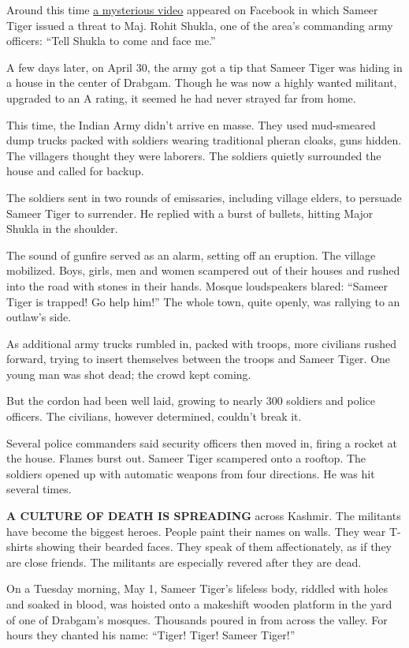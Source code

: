 Around this time \href{https://www.youtube.com/watch?v=Bo8KypsQST4}{a
mysterious video} appeared on Facebook in which Sameer Tiger issued a
threat to Maj. Rohit Shukla, one of the area's commanding army officers:
``Tell Shukla to come and face me.''

A few days later, on April 30, the army got a tip that Sameer Tiger was
hiding in a house in the center of Drabgam. Though he was now a highly
wanted militant, upgraded to an A rating, it seemed he had never strayed
far from home.

This time, the Indian Army didn't arrive en masse. They used mud-smeared
dump trucks packed with soldiers wearing traditional pheran cloaks, guns
hidden. The villagers thought they were laborers. The soldiers quietly
surrounded the house and called for backup.

The soldiers sent in two rounds of emissaries, including village elders,
to persuade Sameer Tiger to surrender. He replied with a burst of
bullets, hitting Major Shukla in the shoulder.

The sound of gunfire served as an alarm, setting off an eruption. The
village mobilized. Boys, girls, men and women scampered out of their
houses and rushed into the road with stones in their hands. Mosque
loudspeakers blared: ``Sameer Tiger is trapped! Go help him!'' The whole
town, quite openly, was rallying to an outlaw's side.

As additional army trucks rumbled in, packed with troops, more civilians
rushed forward, trying to insert themselves between the troops and
Sameer Tiger. One young man was shot dead; the crowd kept coming.

But the cordon had been well laid, growing to nearly 300 soldiers and
police officers. The civilians, however determined, couldn't break it.

Several police commanders said security officers then moved in, firing a
rocket at the house. Flames burst out. Sameer Tiger scampered onto a
rooftop. The soldiers opened up with automatic weapons from four
directions. He was hit several times.

\textbf{A CULTURE OF DEATH IS SPREADING} across Kashmir. The militants
have become the biggest heroes. People paint their names on walls. They
wear T-shirts showing their bearded faces. They speak of them
affectionately, as if they are close friends. The militants are
especially revered after they are dead.

On a Tuesday morning, May 1, Sameer Tiger's lifeless body, riddled with
holes and soaked in blood, was hoisted onto a makeshift wooden platform
in the yard of one of Drabgam's mosques. Thousands poured in from across
the valley. For hours they chanted his name: ``Tiger! Tiger! Sameer
Tiger!''

